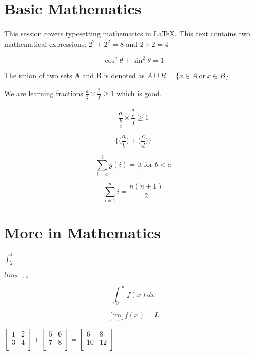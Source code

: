\documentclass{article}
\begin{document}
	\section{Basic Mathematics}
    \paragraph{}
    This session covers typesetting mathematics in LaTeX. This text contains two mathematical expressions: 
    $ 2^{2} + 2^{2} = 8$ and $ 2 \times 2 = 4$

    \[ \cos^2 \theta + \sin^2 \theta = 1\]
    
    The union of two sets A and B is denoted as 
    $ A \cup B = \{ x \in A \ \text{or} \ x \in B \} $
    
    We are learning fractions $ \frac{a}{\frac{b}{c}} \times \frac{\frac{d}{e}}{f} \geq 1$ which is good.

    \[ \frac{a}{\frac{b}{c}} \times \frac{\frac{d}{e}}{f} \geq 1\]

    \[ \Bigg\{ \bigg(\frac{a}{b}\bigg) + \bigg(\frac{c}{d}\bigg)\Bigg\} \]

    \[ \sum_{i=a}^{b} g(i) = 0, \text{for } b < a \]

    \[ \sum_{i=1}^{n} i = \frac{n(n+1)}{2} \]

    \section{More in Mathematics}

    $\int_{2}^{4}$

    $lim_{2 \to 4}$

    \[ \int_{0}^{\infty} f(x)dx \]

    \[ \lim_{x \to c} f(x)=L \]

    $
    \begin{bmatrix}
        1 & 2 \\
        3 & 4 \\
    \end{bmatrix}
    +
    \begin{bmatrix}
        5 & 6 \\
        7 & 8 \\
    \end{bmatrix}
    =
    \begin{bmatrix}
        6 & 8 \\
        10 & 12 \\
    \end{bmatrix}
    $
\end{document}
